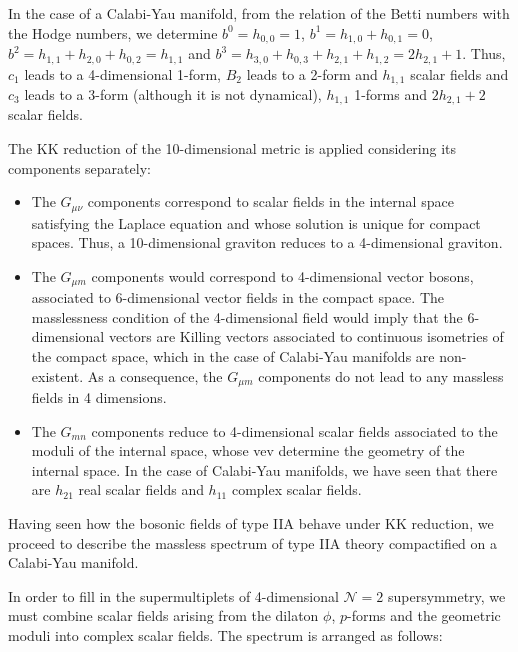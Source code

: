 In the case of a Calabi-Yau manifold, from the relation of the Betti numbers with the Hodge numbers,
we determine $b^0=h_{0,0}=1$, $b^1=h_{1,0}+h_{0,1}=0$, $b^2=h_{1,1}+h_{2,0}+h_{0,2}=h_{1,1}$ and
$b^3=h_{3,0}+h_{0,3}+h_{2,1}+h_{1,2}=2h_{2,1}+1$.
Thus, $c_1$ leads to a 4-dimensional 1-form, 
$B_2$ leads to a 2-form and  $h_{1,1}$ scalar fields 
and $c_3$ leads to a 3-form (although it is not dynamical), $h_{1,1}$ 1-forms and $2h_{2,1}+2$ scalar fields.

The KK reduction of the 10-dimensional metric is applied considering its components separately:
\begin{itemize}
  \item The $G_{\mu\nu}$ components correspond to scalar fields in the internal space satisfying 
    the Laplace equation and whose solution is unique for compact spaces.
    Thus, a 10-dimensional graviton reduces to a 4-dimensional graviton.
  \item The $G_{\mu m}$ components would correspond to 4-dimensional vector bosons, associated
    to 6-dimensional vector fields in the compact space. 
    The masslessness condition of the 4-dimensional field would imply that the 6-dimensional 
    vectors are Killing vectors associated to continuous isometries of the compact space, which
    in the case of Calabi-Yau manifolds are non-existent.
    As a consequence, the $G_{\mu m}$ components do not lead to any massless fields in 4 dimensions.
  \item The $G_{m n}$ components reduce to 4-dimensional scalar fields associated to the moduli of the internal space,
    whose vev determine the geometry of the internal space.
    In the case of Calabi-Yau manifolds, we have seen that there are $h_{21}$ real scalar fields and
    $h_{11}$ complex scalar fields.

%
%
\end{itemize}

Having seen how the bosonic fields of type IIA behave under KK reduction, we proceed to describe the
massless spectrum of type IIA theory compactified on a Calabi-Yau manifold.

In order to fill in the supermultiplets of 4-dimensional $\mathcal N=2$ supersymmetry,
we must combine scalar fields arising from the dilaton $\phi$, $p$-forms and the geometric
moduli into complex scalar fields.
The spectrum is arranged as follows:

